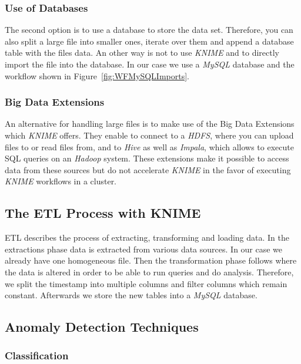 \documentclass{dima}
\begin{document}
\subsubsection{Use of Databases}
The second option is to use a database to store the data set. Therefore, you can also split a large file into smaller ones, iterate over them and append a database table with the files data. An other way is not to use \textit{KNIME} and to directly import the file into the database. In our case we use a \textit{MySQL} database and the workflow shown in Figure~\ref{fig:WFMySQLImports}.


\subsubsection{Big Data Extensions}
An alternative for handling large files is to make use of the Big Data Extensions which \textit{KNIME} offers. They enable to connect to a \textit{HDFS}, where you can upload files to or read files from, and to \textit{Hive} as well as \textit{Impala}, which allows to execute SQL queries on an \textit{Hadoop} system. These extensions make it possible to access data from these sources but do not accelerate \textit{KNIME} in the favor of executing \textit{KNIME} workflows in a cluster.

\subsection{The ETL Process with KNIME}
ETL describes the process of extracting, transforming and loading data. In the extractions phase data is extracted from various data sources. In our case we already have one homogeneous file. Then the transformation phase follows where the data is altered in order to be able to run queries and do analysis. Therefore, we split the timestamp into multiple columns and filter columns which remain constant. Afterwards we store the new tables into a \textit{MySQL} database.


\subsection{Anomaly Detection Techniques}
\subsubsection{Classification}
\end{document}
